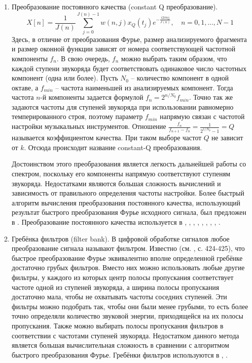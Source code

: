 \begin{enumerate}
  \item Преобразование постоянного качества (constant Q преобразование).
  $$X[n] = \frac{1}{J(n)} \sum_{j=0}^{J(n)-1} w(n,j)x_Q(t_j) e^{-\frac{i 2\pi
  nj}{J(n)}}, \quad n=0, 1, \ldots, N-1$$ Здесь, в отличие от преобразования
  Фурье, размер анализируемого фрагмента и размер оконной функции зависят от
  номера соответствующей частотной компоненты $f_n$. В свою очередь, $f_n$ можно
  выбрать таким образом, что каждой ступени звукоряда будет соответствовать
  одинаковое число частотных компонент (одна или более). Пусть $N_0$ --
  количество компонент в одной октаве, а $f_{min}$ -- частота наименьшей из
  анализируемых компонент. Тогда частота $n$-й компоненты задается формулой
  $f_n = 2^{n/N_0} f_{min}$. Точно так же задаются частоты для ступеней
  звукоряда при использовании равномерно темперированного строя, поэтому параметр
  $f_{min}$ напрямую связан с частотой настройки музыкальных инструментов.
  Отношение $\frac{f_n}{f_{n+1} - f_n} = \frac{1}{2^{1/N_0}-1} = Q$ называется
  коэффициентом качества. При таком выборе частот $Q$ не зависит от $k$. Отсюда
  происходит название constant-Q преобразования.
  
  Достоинством этого преобразования является легкость дальнейшей работы со
  спектром, поскольку его компоненты напрямую соответствуют ступеням звукоряда.
  Недостатками являются большая сложность вычислений и зависимость от
  правильного определения частоты настройки. Более быстрый алгоритм вычисления
  преобразования постоянного качества, использующий результат быстрого
  преобразования Фурье исходного сигнала, был предложен в \cite{Brown1992}.
  Преобразование постоянного качества используется в \cite{Bello2005},
  \cite{Lee2006}, \cite{Mauch2008}, \cite{Mauch2009}, \cite{Oudre2009},
  \cite{Reed2009}, \cite{Cho2010}, \cite{Cho2011}, \cite{Ni2011}.
  
  \item Гребёнка фильтров (filter bank). В цифровой обработке сигналов любое
  преобразование сигнала называют фильтром. Известно (см. \cite{Rabiner1978}, с.
  424-425), что быстрое преобразование Фурье эквивалентно вполне определенной
  гребёнке достаточно грубых фильтров. Вместо них можно использовать любые
  другие фильтры, у каждого из которых центр полосы пропускания соответствует
  частоте одной из ступеней звукоряда, а ширина полосы пропускания достаточно
  мала, чтобы не охватывать частоты соседних ступеней. Эти фильтры можно
  подобрать так, чтобы они были менее грубыми, то есть более точно определяли
  количество звуковой энергии, приходящейся на их полосы пропускания. Также
  можно выбирать полосы пропускания фильтров в соответствии с частотами ступеней
  звукоряда. Недостатком данного метода является большая вычислительная
  сложность в сравнении с алгоритмом быстрого преобразования Фурье. Гребёнки
  фильтров используются в \cite{Jiang2011}, \cite{Humphrey2012}.
\end{enumerate}

